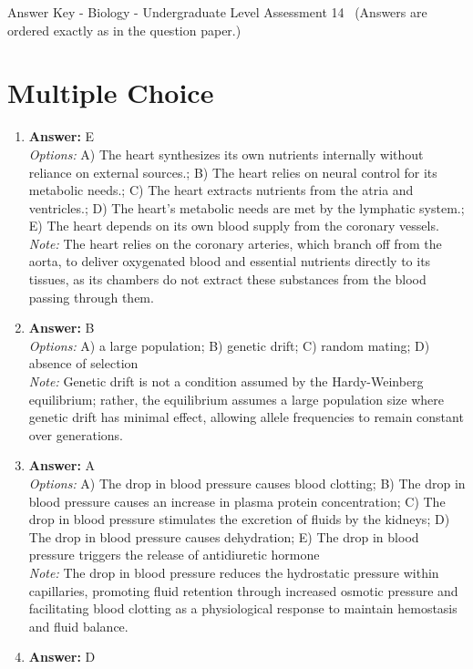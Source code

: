 \documentclass[12pt]{article}
\begin{document}
\begin{center}
Answer Key - Biology - Undergraduate Level Assessment 14 \
\small (Answers are ordered exactly as in the question paper.)
\end{center}

\section*{Multiple Choice}
\begin{enumerate}[label=\arabic*.]
\item \textbf{Answer:} E
\\ \textit{Options:} A) The heart synthesizes its own nutrients internally without reliance on external sources.; B) The heart relies on neural control for its metabolic needs.; C) The heart extracts nutrients from the atria and ventricles.; D) The heart's metabolic needs are met by the lymphatic system.; E) The heart depends on its own blood supply from the coronary vessels.
\\ \textit{Note:} The heart relies on the coronary arteries, which branch off from the aorta, to deliver oxygenated blood and essential nutrients directly to its tissues, as its chambers do not extract these substances from the blood passing through them.
\item \textbf{Answer:} B
\\ \textit{Options:} A) a large population; B) genetic drift; C) random mating; D) absence of selection
\\ \textit{Note:} Genetic drift is not a condition assumed by the Hardy-Weinberg equilibrium; rather, the equilibrium assumes a large population size where genetic drift has minimal effect, allowing allele frequencies to remain constant over generations.
\item \textbf{Answer:} A
\\ \textit{Options:} A) The drop in blood pressure causes blood clotting; B) The drop in blood pressure causes an increase in plasma protein concentration; C) The drop in blood pressure stimulates the excretion of fluids by the kidneys; D) The drop in blood pressure causes dehydration; E) The drop in blood pressure triggers the release of antidiuretic hormone
\\ \textit{Note:} The drop in blood pressure reduces the hydrostatic pressure within capillaries, promoting fluid retention through increased osmotic pressure and facilitating blood clotting as a physiological response to maintain hemostasis and fluid balance.
\item \textbf{Answer:} D

\end{enumerate}
\end{document}
